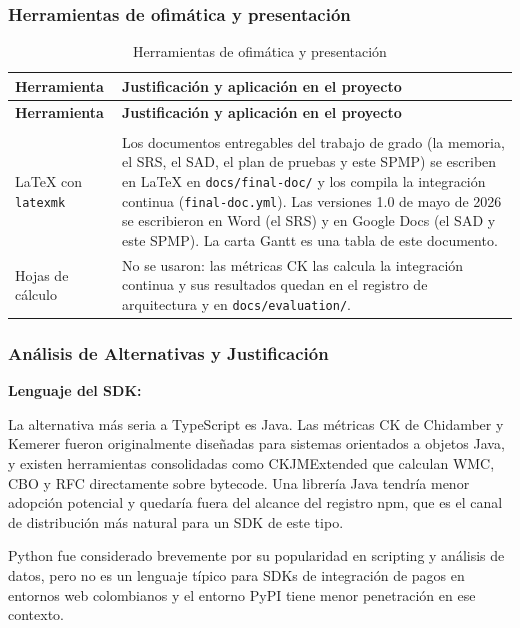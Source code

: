 \subsubsection{Herramientas de ofimática y presentación}

\begin{center}
\renewcommand{\arraystretch}{1.2}
\begin{longtable}{|P{0.5}|P{0.5}|}
  \hline
  \textbf{Herramienta} & \textbf{Justificación y aplicación en el proyecto} \\
  \hline
  \endfirsthead
  \hline
  \textbf{Herramienta} & \textbf{Justificación y aplicación en el proyecto} \\
  \hline
  \endhead
  \caption{Herramientas de ofimática y presentación}
  \label{tab:herramientas-ofimatica}\\
  \endlastfoot
  LaTeX con \texttt{latexmk} & Los documentos entregables del trabajo de grado (la memoria, el SRS, el SAD, el plan de pruebas y este SPMP) se escriben en LaTeX en \texttt{docs/final-doc/} y los compila la integración continua (\texttt{final-doc.yml}). Las versiones 1.0 de mayo de 2026 se escribieron en Word (el SRS) y en Google Docs (el SAD y este SPMP). La carta Gantt es una tabla de este documento. \\
  \hline
  Hojas de cálculo & No se usaron: las métricas CK las calcula la integración continua y sus resultados quedan en el registro de arquitectura y en \texttt{docs/evaluation/}. \\
  \hline
\end{longtable}
\end{center}

\subsubsection{Análisis de Alternativas y Justificación}

\textbf{Lenguaje del SDK:}

La alternativa más seria a TypeScript es Java. Las métricas CK de Chidamber y Kemerer fueron originalmente diseñadas para sistemas orientados a objetos Java, y existen herramientas consolidadas como CKJMExtended que calculan WMC, CBO y RFC directamente sobre bytecode. Una librería Java tendría menor adopción potencial y quedaría fuera del alcance del registro npm, que es el canal de distribución más natural para un SDK de este tipo.

Python fue considerado brevemente por su popularidad en scripting y análisis de datos, pero no es un lenguaje típico para SDKs de integración de pagos en entornos web colombianos y el entorno PyPI tiene menor penetración en ese contexto.

